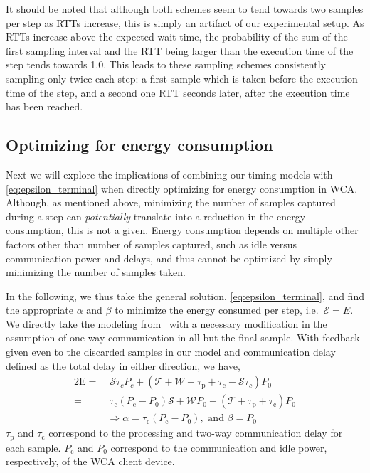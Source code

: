 It should be noted that although both schemes seem to tend towards two samples per step as \glspl{RTT} increase, this is simply an artifact of our experimental setup.
As \glspl{RTT} increase above the expected wait time, the probability of the sum of the first sampling interval and the \gls{RTT} being larger than the execution time of the step tends towards \num{1.0}.
This leads to these sampling schemes consistently sampling only twice each step: a first sample which is taken before the execution time of the step, and a second one \gls{RTT} seconds later, after the execution time has been reached.

\subsection{Optimizing for energy consumption}\label{ssec:optimization:energy}

Next we will explore the implications of combining our timing models with \cref{eq:epsilon_terminal} when directly optimizing for energy consumption in \gls{WCA}.
Although, as mentioned above, minimizing the number of samples captured during a step can \emph{potentially} translate into a reduction in the energy consumption, this is not a given.
Energy consumption depends on multiple other factors other than number of samples captured, such as idle versus communication power and delays, and thus cannot be optimized by simply minimizing the number of samples taken.

In the following, we thus take the general solution, \cref{eq:epsilon_terminal}, and find the appropriate \( \alpha \) and \( \beta \) to minimize the energy consumed per step, i.e.\ \( \mathcal{E}=E \).
We directly take the modeling from~\cite{moothedath2022energy2} with a necessary modification in the  assumption of one-way communication in all but the final sample.
With feedback given even to the discarded samples in our model and communication delay defined as the total delay in either direction, we have, 
\begin{alignat}{2}
    \mathrm{E}=&\;\mathcal{S}\tau_cP_c+(\mathcal{T}+\mathcal{W}+\tau_\mathrm{p}+\tau_\mathrm{c}-\mathcal{S}\tau_c)P_0\nonumber\\
    =&\;\tau_{\text{c}}(P_{\text{c}} -P_0)\mathcal{S}+\mathcal{W}P_0+(\mathcal{T}+\tau_{\text{p}} +\tau_{\text{c}}) P_0\nonumber\\
&\Rightarrow \alpha=\tau_{\text{c}}(P_{\text{c}} -P_0),\text{ and }\beta=P_0 \label{eq:optimization:energy}
\end{alignat}
\( \tau_\text{p} \) and \( \tau_\text{c} \) correspond to the processing and two-way communication delay for each sample.
\( P_\text{c} \) and \( P_0 \) correspond to the communication and idle power, respectively, of the \gls{WCA} client device.

